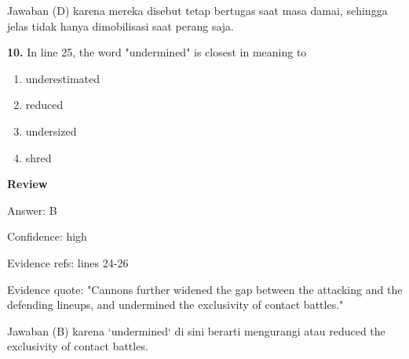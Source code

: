 \documentclass[12pt]{article}
\begin{document}
Jawaban (D) karena mereka disebut tetap bertugas saat masa damai, sehingga jelas tidak hanya dimobilisasi saat perang saja.\par
\endgroup
\par
\vspace{0.25\baselineskip}
\noindent\textbf{10.} In line 25, the word "undermined" is closest in meaning to
\begin{enumerate}[label=(\Alph*),leftmargin=*,itemsep=0.2em]
\item underestimated
\item reduced
\item undersized
\item shred
\end{enumerate}
\par
\begingroup
\setlength{\parskip}{0pt}
\setlength{\parindent}{0pt}
\textbf{Review}\par
Answer: B\par
Confidence: high\par
Evidence refs: lines 24-26\par
Evidence quote: "Cannons further widened the gap between the attacking and the defending lineups, and undermined the exclusivity of contact battles."\par
Jawaban (B) karena `undermined` di sini berarti mengurangi atau reduced the exclusivity of contact battles.\par
\endgroup
\par
\vspace{0.25\baselineskip}
\end{document}
